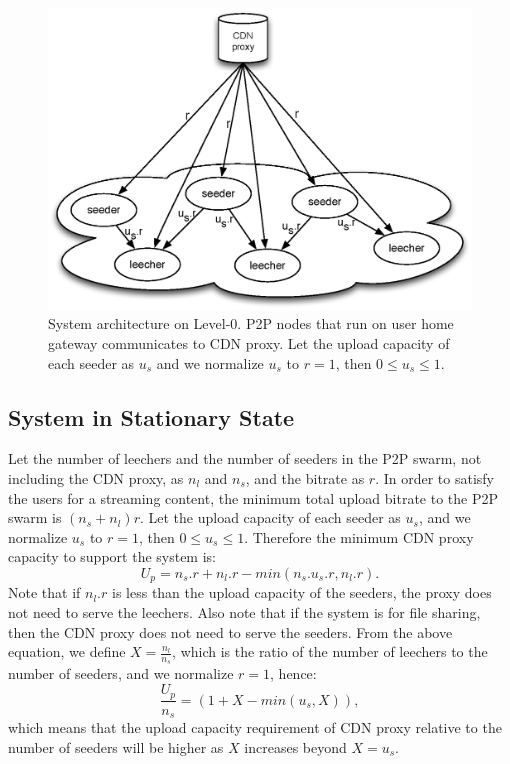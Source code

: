 \documentclass[paper]{ieice}
\begin{document}
\begin{figure}[tb] 
\begin{center}
\includegraphics[scale=0.45]{graphs/two-tier-cdn-topology-2.eps}
\end{center}
\caption{System architecture on Level-0. P2P nodes that run on user home gateway communicates to CDN proxy.
Let the upload capacity of each seeder as $u_s$ and we normalize $u_s$ to $r=1$, then  $0 \leq u_s \leq 1$.}
\label{fig:twotier2}
\vspace{-2mm}
\end{figure}

\subsection{System in Stationary State}

Let the number of leechers and the number of seeders in the P2P swarm, not including the CDN proxy, as $n_l$ and $n_s$, and the bitrate as $r$.
In order to satisfy the users for a streaming content, the minimum total upload bitrate to the P2P swarm is $(n_s + n_l)r$.
Let the upload capacity of each seeder as $u_s$, and we normalize $u_s$ to $r=1$, then $0 \leq u_s \leq 1$. Therefore the minimum CDN proxy capacity to support the system is:
\begin{equation}
        U_p = n_s.r + n_l.r - min(n_s.u_s.r, n_l.r).
\end{equation}
Note that if $n_l.r$ is less than the upload capacity of the seeders, the proxy does not need to serve the leechers.
Also note that if the system is for file sharing, then the CDN proxy does not need to serve the seeders.
From the above equation, we define $X=\frac{n_l}{n_s}$, which is the ratio of the number of leechers to the number of seeders, and we normalize $r=1$, hence:
\begin{equation}
        \frac{U_p}{n_s} = (1 + X - min (u_s,X)),
\end{equation}
which means that the upload capacity requirement of CDN proxy relative to the number of seeders will be higher as $X$ increases beyond $X = u_s$.
\end{document}
